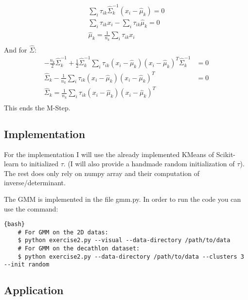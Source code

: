 \documentclass{article}
\begin{document}
\begin{equation*}
    \begin{aligned}
        \sum_i \tau_{ik} \widehat\Sigma_k^{-1} (x_i - \widehat\mu_k) = 0 \\
        \sum_i \tau_{ik} x_i - \sum_i \tau_{ik} \widehat\mu_k = 0        \\
        \boxed{\widehat\mu_k = \frac{1}{n_k}\sum_i \tau_{ik} x_i}        \\
    \end{aligned}
\end{equation*}
And for $\widehat\Sigma$:
\begin{equation*}
    \begin{aligned}
        -\frac{n_k}{2} \widehat\Sigma_k^{-1} + \frac{1}{2}\widehat\Sigma_k^{-1} \sum_i \tau_{ik}  (x_i - \widehat\mu_k)(x_i - \widehat\mu_k)^T \widehat\Sigma_k^{-1} & = 0 \\
        \widehat\Sigma_k - \frac{1}{n_k} \sum_i \tau_{ik}  (x_i - \widehat\mu_k)(x_i - \widehat\mu_k)^T                                                              & =0  \\
        \boxed{\widehat\Sigma_k = \frac{1}{n_k}\sum_i \tau_{ik} (x_i - \widehat\mu_k)(x_i - \widehat\mu_k)^T}                                                        &     \\
    \end{aligned}
\end{equation*}
This ends the M-Step.

\subsection{Implementation}

For the implementation I will use the already implemented KMeans of Scikit-learn to initialized $\tau$. (I will also provide a handmade
random initialization of $\tau$). The rest does only rely on numpy array and their computation of inverse/determinant.

The GMM is implemented in the file gmm.py. In order to run the code you can use the command:
\begin{lstlisting}{bash}
    # For GMM on the 2D datas:
    $ python exercise2.py --visual --data-directory /path/to/data
    # For GMM on the decathlon dataset:
    $ python exercise2.py --data-directory /path/to/data --clusters 3 --init random
\end{lstlisting}

\subsection{Application}
\end{document}
